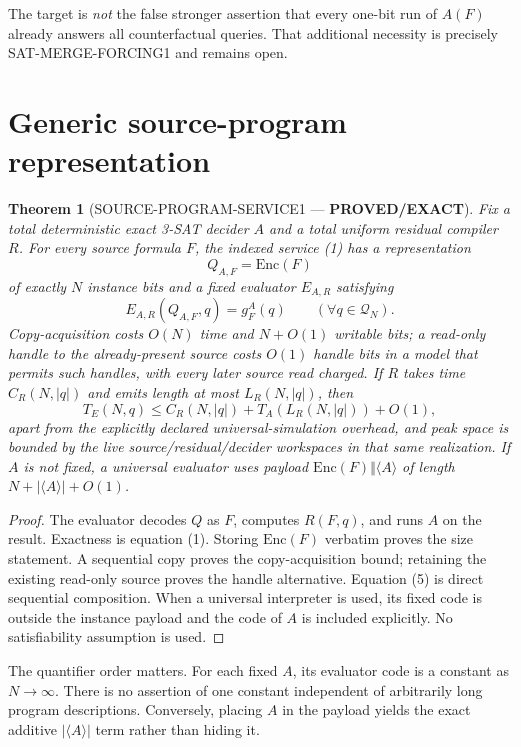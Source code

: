 \documentclass[11pt]{article}
\newtheorem{theorem}{Theorem}
\newcommand{\status}[1]{\textbf{#1}}
\begin{document}
The target is \emph{not} the false stronger assertion that every one-bit run
of $A(F)$ already answers all counterfactual queries.  That additional
necessity is precisely \textsf{SAT-MERGE-FORCING1} and remains open.

\section{Generic source-program representation}
\begin{theorem}[SOURCE-PROGRAM-SERVICE1 --- \status{PROVED/EXACT}]
Fix a total deterministic exact 3-SAT decider $A$ and a total uniform residual
compiler $R$.  For every source formula $F$, the indexed service (1) has a
representation
\[
 Q_{A,F}=\mathrm{Enc}(F)                                  \tag{3}
\]
of exactly $N$ instance bits and a fixed evaluator $E_{A,R}$ satisfying
\[
 E_{A,R}(Q_{A,F},q)=g_F^A(q)\qquad(\forall q\in\mathcal Q_N).  \tag{4}
\]
Copy-acquisition costs $O(N)$ time and $N+O(1)$ writable bits; a read-only
handle to the already-present source costs $O(1)$ handle bits in a model that
permits such handles, with every later source read charged.  If $R$ takes time
$C_R(N,|q|)$ and emits length at most $L_R(N,|q|)$, then
\[
 T_E(N,q)\le C_R(N,|q|)+T_A(L_R(N,|q|))+O(1),             \tag{5}
\]
apart from the explicitly declared universal-simulation overhead, and peak
space is bounded by the live source/residual/decider workspaces in that same
realization.  If $A$ is not fixed, a universal evaluator uses payload
$\mathrm{Enc}(F)\Vert\langle A\rangle$ of length
$N+|\langle A\rangle|+O(1)$.
\end{theorem}
\begin{proof}
The evaluator decodes $Q$ as $F$, computes $R(F,q)$, and runs $A$ on the
result.  Exactness is equation (1).  Storing $\mathrm{Enc}(F)$ verbatim proves
the size statement.  A sequential copy proves the copy-acquisition bound;
retaining the existing read-only source proves the handle alternative.
Equation (5) is direct sequential composition.  When a universal interpreter
is used, its fixed code is outside the instance payload and the code of $A$
is included explicitly.  No satisfiability assumption is used.
\end{proof}

The quantifier order matters.  For each fixed $A$, its evaluator code is a
constant as $N\to\infty$.  There is no assertion of one constant independent
of arbitrarily long program descriptions.  Conversely, placing $A$ in the
payload yields the exact additive $|\langle A\rangle|$ term rather than hiding
it.
\end{document}
